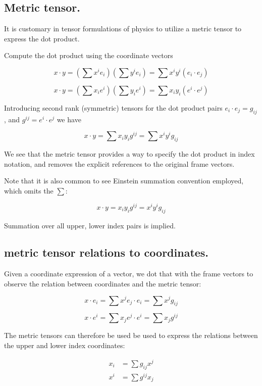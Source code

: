 \documentclass{article}      %
\begin{document}
\subsection{ Metric tensor. }

It is customary in tensor formulations of physics to utilize a metric tensor to express the dot product.

Compute the dot product using the coordinate vectors

\[
x \cdot y = \left(\sum x^i e_i \right)\left(\sum y^i e_i \right) = \sum x^i y^i \left( e_i \cdot e_j \right)
\]

\[
x \cdot y = \left(\sum x_i e^i \right)\left(\sum y_i e^i \right) = \sum x_i y_i \left( e^i \cdot e^j \right)
\]

Introducing second rank (symmetric) tensors for the dot product pairs $ e_i \cdot e_j = g_{ij}$, and $ g^{ij} = e^i \cdot e^j $ we have

\[
x \cdot y = \sum x_i y_i g^{ij} = \sum x^i y^i g_{ij}
\]

We see that the metric tensor provides a way to specify the dot product in index notation, and removes the explicit references to the original frame vectors.

Note that it is also common to see Einstein summation convention employed, which omits the $\sum$:

\[
x \cdot y = x_i y_i g^{ij} = x^i y^i g_{ij}
\]

Summation over all upper, lower index pairs is implied.

\subsection{ metric tensor relations to coordinates. }

Given a coordinate expression of a vector, we dot that with the frame vectors to observe the relation between coordinates and the metric tensor:

\[
x \cdot e_i = \sum x^j e_j \cdot e_i = \sum x^j g_{ij}
\]

\[
x \cdot e^i = \sum x_j e^j \cdot e^i = \sum x_j g^{ij}
\]

The metric tensors can therefore be used be used to express the relations between the upper and lower index coordinates:

\begin{align}
x_i &= \sum g_{ij} x^j \label{eqn:metric_upper_to_lower} \\
x^i &= \sum g^{ij} x_j \label{eqn:metric_lower_to_upper}
\end{align}
\end{document}
